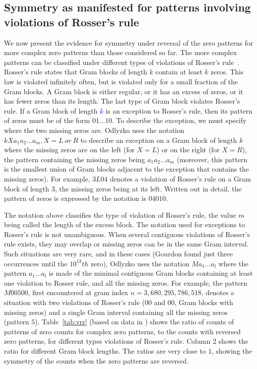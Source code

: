 \documentclass[twoside]{article}
\theoremstyle{definition}
\begin{document}
\subsection{\label{sec6a}Symmetry as manifested for patterns involving violations of Rosser's rule}

We now present the evidence for symmetry under reversal of the zero patterns for more complex zero patterns than those considered so far. The more complex patterns can be classified under different types of violations of Rosser's rule~\cite{gourdon}. Rosser's rule states that Gram blocks of length $k$ contain at least $k$ zeros. This law is violated infinitely often, but is violated only for a small fraction of the Gram blocks. A Gram block is either regular, or it has an excess of zeros, or it has fewer zeros than its length. The last type of Gram block violates Rosser's rule. 
If a Gram block of length \textcolor{blue}{$k$} is an exception to Rosser's rule, then its pattern of zeros must be of the form $01...10$. To describe the exception, we must specify where the two missing zeros are. Odlyzko uses the notation $kXa_1a_2 . . . a_m, X = L~or~R $ 
to describe an exception on a Gram block of length $k$  where the missing zeros are on the left (for $X = L$) or on the right (for $X = R$), the pattern containing the missing zeros being $a_1a_2 . . . a_m$ (moreover, this pattern is the smallest union of Gram blocks adjacent to the exception that contains the missing zeros). For example, $3L04$ denotes a violation of Rosser's rule on a Gram block of length 3, the missing zeros being at its left. Written out in detail, the pattern of zeros is expressed by the notation is $04010$.

The notation above classifies the type of violation of Rosser's rule, the value $m$ being called the length of the excess block. The notation used for exceptions to Rosser's rule is not unambiguous. When several contiguous violations of Rosser's rule exists, they may overlap or missing zeros can be in the same Gram interval. Such situations are very rare, and in these cases (Gourdon found just three occurrences until the $10^{13}th$ zero), Odlyzko uses the notation $Ma_1 ...a_l$ where the pattern $a_1 . . . a_l$ is made of the minimal contiguous Gram blocks containing at least one violation to Rosser rule, and all the missing zeros. For example, the pattern $M00500$, first encountered at gram index $n = 3,680,295,786,518$, denotes a situation with two violations of Rosser's rule ($00$ and $00$, Gram blocks with missing zeros) and a single Gram interval containing all the missing zeros (pattern $5$). 
Table~\ref{tab:vrr}  (based on data in \cite{gourdon}) shows the  ratio of counts of patterns of zero counts for complex zero patterns, to the counts with reversed zero patterns, for different types violations of Rosser's rule. Column 2 shows the ratio for different Gram block lengths. The ratios are very close to  $1$, showing the symmetry of the counts when the zero patterns are reversed.
\end{document}
